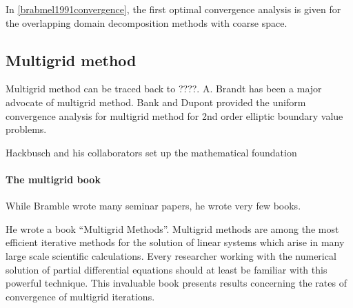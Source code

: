 \documentclass[CJK,11pt]{amsart}
\theoremstyle{definition}
\begin{document}
\begin{CJK*}{UTF8}{gbsn}
In \eqref{brabmel1991convergence}, the first optimal convergence analysis is given for the overlapping domain decomposition methods with coarse space. 

\subsection{Multigrid method}
Multigrid method can be traced back to ????.  A. Brandt has been a major advocate of multigrid method.  Bank and Dupont provided the uniform convergence analysis for multigrid method for 2nd order elliptic boundary value problems. 

Hackbusch and his collaborators set up the mathematical foundation 


\paragraph{The multigrid book}  While Bramble wrote many seminar papers, he wrote very few books. 

He wrote a book “Multigrid Methods”. Multigrid methods are among the most efficient iterative methods for the solution of linear systems which arise in many large scale scientific calculations. Every researcher working with the numerical solution of partial differential equations should at least be familiar with this powerful technique. This invaluable book presents results concerning the rates of convergence of multigrid iterations.




\end{CJK*}
\end{document}
